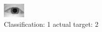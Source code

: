 \begin{figure}[h!]
\begin{center}
\includegraphics[width=0.60\columnwidth]{figures/ID929_class_1_target_2.png}
\end{center}
\caption{ Classification: 1 actual target: 2}
\label{fig:ID929_class_1_target_2}
\end{figure}
